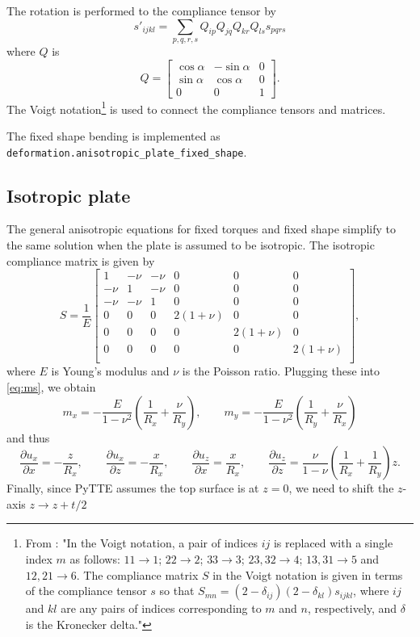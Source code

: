 \documentclass[11pt,a4paper]{article}
\begin{document}
The rotation is performed to the compliance tensor by
\begin{equation}
s'_{ijkl} = \sum_{p,q,r,s} Q_{ip}Q_{jq}Q_{kr}Q_{ls} s_{pqrs} 
\end{equation}
where $Q$ is 
\begin{equation}
Q = \left[\begin{matrix}
\cos \alpha & -\sin \alpha & 0 \\
\sin \alpha & \cos \alpha & 0 \\
0 & 0 & 1
\end{matrix}\right].
\end{equation}
The Voigt notation\footnote{From \cite{Honkanen_2020}: "In the Voigt notation, a pair of indices $ij$ is replaced with a single index $m$ as follows: $11 \rightarrow 1$; $22 \rightarrow 2$; $33 \rightarrow 3$; $23,32 \rightarrow 4$; $13, 31 \rightarrow 5$ and $12, 21 \rightarrow 6$. The compliance matrix $S$ in the Voigt notation is given in terms of the compliance tensor $s$ so that $S_{mn} = (2 - \delta_{ij})(2 - \delta_{kl})s_{ijkl}$, where $ij$ and $kl$ are any pairs of indices corresponding to $m$ and $n$, respectively, and $\delta$ is the Kronecker delta."} is used to connect the compliance tensors and matrices.

The fixed shape bending is implemented as \texttt{deformation.anisotropic\_plate\_fixed\_shape}.

\subsection{Isotropic plate}
The general anisotropic equations for fixed torques and fixed shape simplify to the same solution when the plate is assumed to be isotropic. The isotropic compliance matrix is given by
\begin{equation}
S = \frac{1}{E}\left[\begin{matrix}
1 & -\nu & -\nu & 0 & 0 & 0 \\
-\nu & 1 & -\nu & 0 & 0 & 0 \\
-\nu & -\nu & 1 & 0 & 0 & 0 \\
0 & 0 & 0 & 2(1+\nu) & 0 & 0 \\
0 & 0 & 0 & 0 &2(1+\nu)  & 0 \\
0 & 0 & 0 & 0 & 0 & 2(1+\nu) \\
\end{matrix}\right],
\end{equation}
where $E$ is Young's modulus and $\nu$ is the Poisson ratio.
Plugging these into \eqref{eq:ms}, we obtain
\begin{equation}
m_x = -\frac{E}{1-\nu^2}\left(\frac{1}{R_x}+\frac{\nu}{R_y} \right), \qquad
m_y = -\frac{E}{1-\nu^2}\left(\frac{1}{R_y}+\frac{\nu}{R_x} \right)
\end{equation}
and thus 
\begin{equation}
\frac{\partial u_x}{\partial x} = -\frac{z}{R_x}, \qquad
\frac{\partial u_x}{\partial z} = -\frac{x}{R_x}, \qquad
\frac{\partial u_z}{\partial x} = \frac{x}{R_x}, \qquad
\frac{\partial u_z}{\partial z} = \frac{\nu}{1-\nu}\left(\frac{1}{R_x}+\frac{1}{R_y}\right)z.
\end{equation}
Finally, since PyTTE assumes the top surface is at $z=0$, we need to shift the $z$-axis $z \rightarrow z + t/2 $
\end{document}
